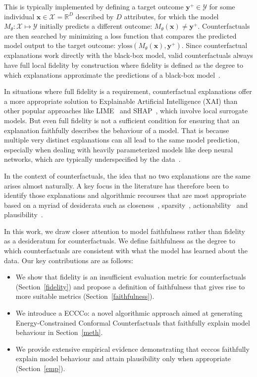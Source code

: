 This is typically implemented by defining a target outcome $\mathbf{y}^+ \in \mathcal{Y}$ for some individual $\mathbf{x} \in \mathcal{X}=\mathbb{R}^D$ described by $D$ attributes, for which the model $M_{\theta}:\mathcal{X}\mapsto\mathcal{Y}$ initially predicts a different outcome: $M_{\theta}(\mathbf{x})\ne \mathbf{y}^+$. Counterfactuals are then searched by minimizing a loss function that compares the predicted model output to the target outcome: $\text{yloss}(M_{\theta}(\mathbf{x}),\mathbf{y}^+)$. Since counterfactual explanations work directly with the black-box model, valid counterfactuals always have full local fidelity by construction where fidelity is defined as the degree to which explanations approximate the predictions of a black-box model~\citep{mothilal2020explaining,molnar2022interpretable}. 

In situations where full fidelity is a requirement, counterfactual explanations offer a more appropriate solution to Explainable Artificial Intelligence (XAI) than other popular approaches like LIME~\citep{ribeiro2016why} and SHAP~\citep{lundberg2017unified}, which involve local surrogate models. But even full fidelity is not a sufficient condition for ensuring that an explanation faithfully describes the behaviour of a model. That is because multiple very distinct explanations can all lead to the same model prediction, especially when dealing with heavily parameterized models like deep neural networks, which are typically underspecified by the data~\citep{wilson2020case}.

In the context of counterfactuals, the idea that no two explanations are the same arises almost naturally. A key focus in the literature has therefore been to identify those explanations and algorithmic recourses that are most appropriate based on a myriad of desiderata such as closeness~\citep{wachter2017counterfactual}, sparsity~\citep{schut2021generating}, actionability~\citep{ustun2019actionable} and plausibility~\citep{joshi2019realistic}. 

In this work, we draw closer attention to model faithfulness rather than fidelity as a desideratum for counterfactuals. We define faithfulness as the degree to which counterfactuals are consistent with what the model has learned about the data. Our key contributions are as follows: 

\begin{itemize}
  \item We show that fidelity is an insufficient evaluation metric for counterfactuals (Section~\ref{fidelity}) and propose a definition of faithfulness that gives rise to more suitable metrics (Section~\ref{faithfulness}).
  \item We introduce a ECCCo: a novel algorithmic approach aimed at generating Energy-Constrained Conformal Counterfactuals that faithfully explain model behaviour in Section~\ref{meth}.
  \item We provide extensive empirical evidence demonstrating that ecccos faithfully explain model behaviour and attain plausibility only when appropriate (Section~\ref{emp}).
\end{itemize}

